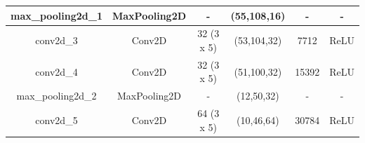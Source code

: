 \begin{table}[!h]
{\begin{tabular}{@{}cccccc@{}}
            \multicolumn{1}{|c|}{max\_pooling2d\_1} & \multicolumn{1}{c|}{MaxPooling2D}  & \multicolumn{1}{c|}{-}                                                                     & \multicolumn{1}{c|}{(55,108,16)}                                                               & \multicolumn{1}{c|}{-}                                                                          & \multicolumn{1}{c|}{-}                                                                         \\ \midrule
            \multicolumn{1}{|c|}{conv2d\_3}         & \multicolumn{1}{c|}{Conv2D}        & \multicolumn{1}{c|}{32 (3 x 5)}                                                            & \multicolumn{1}{c|}{(53,104,32)}                                                               & \multicolumn{1}{c|}{7712}                                                                       & \multicolumn{1}{c|}{ReLU}                                                                      \\ \midrule
            \multicolumn{1}{|c|}{conv2d\_4}         & \multicolumn{1}{c|}{Conv2D}        & \multicolumn{1}{c|}{32 (3 x 5)}                                                            & \multicolumn{1}{c|}{(51,100,32)}                                                               & \multicolumn{1}{c|}{15392}                                                                      & \multicolumn{1}{c|}{ReLU}                                                                      \\ \midrule
            \multicolumn{1}{|c|}{max\_pooling2d\_2} & \multicolumn{1}{c|}{MaxPooling2D}  & \multicolumn{1}{c|}{-}                                                                     & \multicolumn{1}{c|}{(12,50,32)}                                                                & \multicolumn{1}{c|}{-}                                                                          & \multicolumn{1}{c|}{-}                                                                         \\ \midrule
            \multicolumn{1}{|c|}{conv2d\_5}         & \multicolumn{1}{c|}{Conv2D}        & \multicolumn{1}{c|}{64 (3 x 5)}                                                            & \multicolumn{1}{c|}{(10,46,64)}                                                                & \multicolumn{1}{c|}{30784}                                                                      & \multicolumn{1}{c|}{ReLU}                                                                      \\ \midrule

\end{tabular}}
\end{table}

